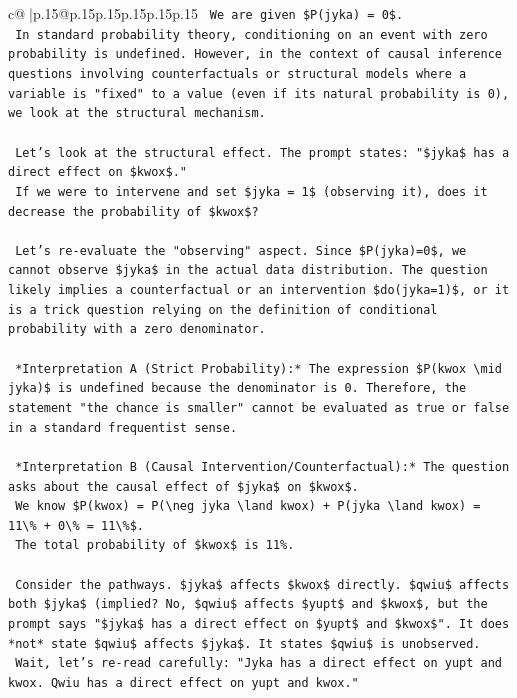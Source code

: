 \documentclass{article}
\begin{document}
{\begin{supertabular}{c@{$\;$}|p{.15\linewidth}@{}p{.15\linewidth}p{.15\linewidth}p{.15\linewidth}p{.15\linewidth}p{.15\linewidth}}
{{{\texttt{        We are given \$P(jyka) = 0\$.} \\
\texttt{        In standard probability theory, conditioning on an event with zero probability is undefined. However, in the context of causal inference questions involving counterfactuals or structural models where a variable is "fixed" to a value (even if its natural probability is 0), we look at the structural mechanism.} \\
\\ 
\texttt{        Let's look at the structural effect. The prompt states: "\$jyka\$ has a direct effect on \$kwox\$."} \\
\texttt{        If we were to intervene and set \$jyka = 1\$ (observing it), does it decrease the probability of \$kwox\$?} \\
\\ 
\texttt{        Let's re{-}evaluate the "observing" aspect. Since \$P(jyka)=0\$, we cannot observe \$jyka\$ in the actual data distribution. The question likely implies a counterfactual or an intervention \$do(jyka=1)\$, or it is a trick question relying on the definition of conditional probability with a zero denominator.} \\
\\ 
\texttt{        *Interpretation A (Strict Probability):* The expression \$P(kwox \textbackslash{}mid jyka)\$ is undefined because the denominator is 0. Therefore, the statement "the chance is smaller" cannot be evaluated as true or false in a standard frequentist sense.} \\
\\ 
\texttt{        *Interpretation B (Causal Intervention/Counterfactual):* The question asks about the causal effect of \$jyka\$ on \$kwox\$.} \\
\texttt{        We know \$P(kwox) = P(\textbackslash{}neg jyka \textbackslash{}land kwox) + P(jyka \textbackslash{}land kwox) = 11\textbackslash{}\% + 0\textbackslash{}\% = 11\textbackslash{}\%\$.} \\
\texttt{        The total probability of \$kwox\$ is 11\%.} \\
\\ 
\texttt{        Consider the pathways. \$jyka\$ affects \$kwox\$ directly. \$qwiu\$ affects both \$jyka\$ (implied? No, \$qwiu\$ affects \$yupt\$ and \$kwox\$, but the prompt says "\$jyka\$ has a direct effect on \$yupt\$ and \$kwox\$". It does *not* state \$qwiu\$ affects \$jyka\$. It states \$qwiu\$ is unobserved.} \\
\texttt{        Wait, let's re{-}read carefully: "Jyka has a direct effect on yupt and kwox. Qwiu has a direct effect on yupt and kwox."} \\
}}}
\end{supertabular}}
\end{document}
